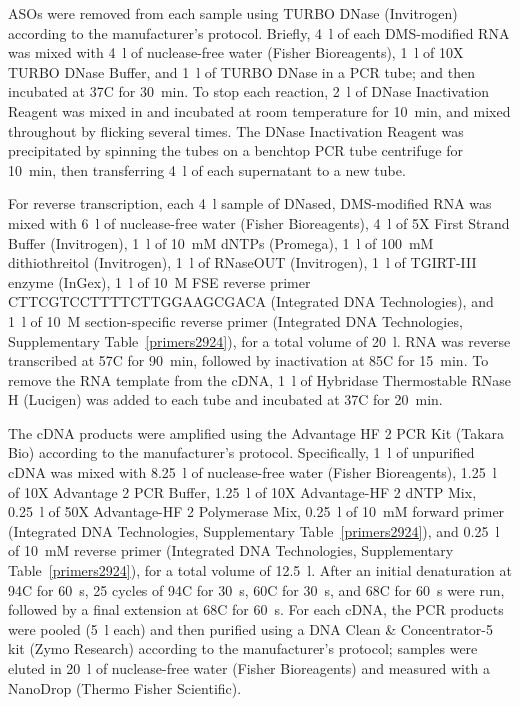 \documentclass[main.tex]{subfiles}
\begin{document}
ASOs were removed from each sample using TURBO DNase (Invitrogen) according to the manufacturer's protocol.
Briefly, 4~\textmu l of each DMS-modified RNA was mixed with 4~\textmu l of nuclease-free water (Fisher Bioreagents), 1~\textmu l of 10X TURBO DNase Buffer, and 1~\textmu l of TURBO DNase in a PCR tube; and then incubated at 37\textdegree C for 30~min.
To stop each reaction, 2~\textmu l of DNase Inactivation Reagent was mixed in and incubated at room temperature for 10~min, and mixed throughout by flicking several times.
The DNase Inactivation Reagent was precipitated by spinning the tubes on a benchtop PCR tube centrifuge for 10~min, then transferring 4~\textmu l of each supernatant to a new tube.

For reverse transcription, each 4~\textmu l sample of DNased, DMS-modified RNA was mixed with 6~\textmu l of nuclease-free water (Fisher Bioreagents), 4~\textmu l of 5X First Strand Buffer (Invitrogen), 1~\textmu l of 10~mM dNTPs (Promega), 1~\textmu l of 100~mM dithiothreitol (Invitrogen), 1~\textmu l of RNaseOUT (Invitrogen), 1~\textmu l of TGIRT-III enzyme (InGex), 1~\textmu l of 10~\textmu M FSE reverse primer CTTCGTCCTTTTCTTGGAAGCGACA (Integrated DNA Technologies), and 1~\textmu l of 10~\textmu M section-specific reverse primer (Integrated DNA Technologies, Supplementary Table~\ref{primers2924}), for a total volume of 20~\textmu l.
RNA was reverse transcribed at 57\textdegree C for 90~min, followed by inactivation at 85\textdegree C for 15~min.
To remove the RNA template from the cDNA, 1~\textmu l of Hybridase Thermostable RNase H (Lucigen) was added to each tube and incubated at 37\textdegree C for 20~min.

The cDNA products were amplified using the Advantage HF 2 PCR Kit (Takara Bio) according to the manufacturer's protocol.
Specifically, 1~\textmu l of unpurified cDNA was mixed with 8.25~\textmu l of nuclease-free water (Fisher Bioreagents), 1.25~\textmu l of 10X Advantage 2 PCR Buffer, 1.25~\textmu l of 10X Advantage-HF 2 dNTP Mix, 0.25~\textmu l of 50X Advantage-HF 2 Polymerase Mix, 0.25~\textmu l of 10~mM forward primer (Integrated DNA Technologies, Supplementary Table~\ref{primers2924}), and 0.25~\textmu l of 10~mM reverse primer (Integrated DNA Technologies, Supplementary Table~\ref{primers2924}), for a total volume of 12.5~\textmu l.
After an initial denaturation at 94\textdegree C for 60~s, 25 cycles of 94\textdegree C for 30~s, 60\textdegree C for 30~s, and 68\textdegree C for 60~s were run, followed by a final extension at 68\textdegree C for 60~s.
For each cDNA, the PCR products were pooled (5~\textmu l each) and then purified using a DNA Clean \& Concentrator-5 kit (Zymo Research) according to the manufacturer's protocol; samples were eluted in 20~\textmu l of nuclease-free water (Fisher Bioreagents) and measured with a NanoDrop (Thermo Fisher Scientific).
\end{document}
